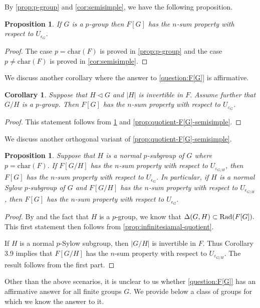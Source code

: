 \documentclass[11pt, a4paper]{amsart}
\newtheorem{prop}[thm]{Proposition}
\newtheorem{cor}[thm]{Corollary}
\theoremstyle{definition}
\numberwithin{equation}{section}
\newcommand{\Rad}{{\rm Rad}}
\begin{document}
By \cref{prop:p-group} and \cref{cor:semisimple}, we have the following proposition. 

\begin{prop} \label{prop:p-group-all}
    If $G$ is a $p$-group then $F[G]$ has the $n$-sum property with respect to $U_{\epsilon_G}.$
\end{prop}

\begin{proof}
    The case $p=\text{char}(F)$ is proved in \cref{prop:p-group} and the case $p \neq \text{char}(F)$ is proved in \cref{cor:semisimple}. 
\end{proof}

We discuss another corollary where the answer to \cref{question:F[G]} is affirmative. 
\begin{cor}
 Suppose that $H \vartriangleleft G$ and $|H|$ is invertible in $F.$ Assume further that $G/H$ is a $p$-group. Then $F[G]$ has the $n$-sum property with respect to $U_{\varepsilon_{G}}$. 
\end{cor}
\begin{proof}
    This statement follows from \cref{prop:p-group-all} and \cref{prop:quotient-F[G]-semisimple}.
\end{proof}

We discuss another orthogonal variant of \cref{prop:quotient-F[G]-semisimple}. 


\begin{prop} \label{prop:F[G]-p-adic-normal}
Suppose that  $H$ is a normal $p$-subgroup of $G$ where $p=\text{char}(F).$ If $F[G/H]$ has the $n$-sum property with respect to $U_{\varepsilon_{G/H}}$, then $F[G]$ has the $n$-sum property with respect to $U_{\epsilon_G}.$ In particular, if $H$ is a normal Sylow $p$-subgroup of $G$ and $F[G/H]$ has the $n$-sum property with respect to $U_{\epsilon_{G/H}}$, then $F[G]$ has the $n$-sum property with respect to $U_{\epsilon_{G}}.$
\end{prop}

\begin{proof}
    By \cite[Theorem 16.6]{passman1971infinite} and the fact that $H$ is a $p$-group, we know that $\Delta(G, H) \subset \Rad(F[G]).$ This first statement then follows from \cref{prop:infinitesiamal-quotient}.

   
    If \(H\) is a normal \(p\)-Sylow subgroup, then \(|G/H|\) is invertible in \(F\).
Thus Corollary 3.9 implies that \(F[G/H]\) has the \(n\)-sum property with respect
to \(U_{\varepsilon_{G/H}}\). The result follows from the first part.
\end{proof}
Other than the above scenarios, it is unclear to us whether \cref{question:F[G]} has an affirmative answer for all finite groups $G.$ We provide below a class of groups for which we know the answer to it. 
\end{document}
